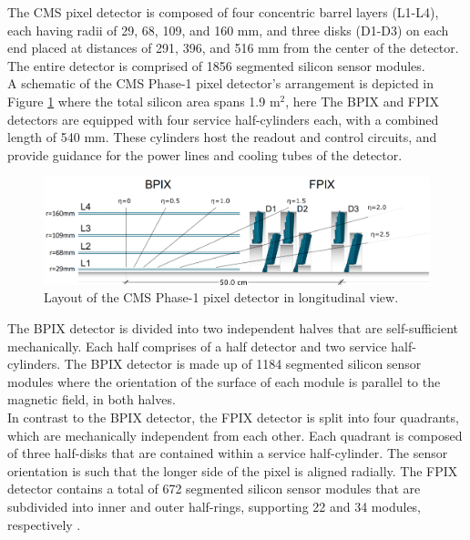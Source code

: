 The CMS pixel detector is composed of four concentric barrel layers (L1-L4), each having radii of 29, 68, 109, and 160 mm, and three disks (D1-D3) on each end placed at distances of 291, 396, and 516 mm from the center of the detector. The entire detector is comprised of 1856 segmented silicon sensor modules.\\  

A schematic of the CMS Phase-1 pixel detector's arrangement is depicted in Figure \ref{phase1_pixel_detector} where the total silicon area spans 1.9 $\text{m}^{2}$, here The BPIX and FPIX detectors are equipped with four service half-cylinders each, with a combined length of 540 mm. These cylinders host the readout and control circuits, and provide guidance for the power lines and cooling tubes of the detector.

\begin{center}
  \begin{figure}[h]
    \centering
    \includegraphics[scale=.26]{Chapter2/phase1_PixelDetector.png}
    \caption[CMS Phase-1 pixel detector]{Layout of the CMS Phase-1 pixel detector in longitudinal view\cite{phase1_Pixel_Detector}.}
    \label{phase1_pixel_detector}
  \end{figure}
\end{center}

The BPIX detector is divided into two independent halves that are self-sufficient mechanically. Each half comprises of a half detector and two service half-cylinders. The BPIX detector is made up of 1184 segmented silicon sensor modules where the orientation of the surface of each module is parallel to the magnetic field, in both halves.\\

In contrast to the BPIX detector, the FPIX detector is split into four quadrants, which are mechanically independent from each other. Each quadrant is composed of three half-disks that are contained within a service half-cylinder. The sensor orientation is such that the longer side of the pixel is aligned radially. The FPIX detector contains a total of 672 segmented silicon sensor modules that are subdivided into inner and outer half-rings, supporting 22 and 34 modules, respectively  \cite{phase1_Pixel_Detector}.\\

